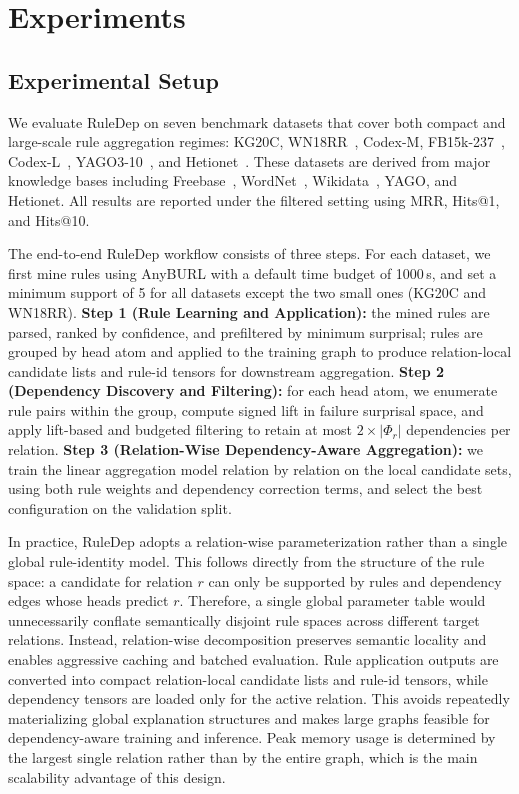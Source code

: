 \section{Experiments}
\label{sec:exp}

\subsection{Experimental Setup}

We evaluate RuleDep on seven benchmark datasets that cover both compact and large-scale rule aggregation regimes: KG20C, WN18RR~\cite{dettmers2018convolutional}, Codex-M, FB15k-237~\cite{toutanova2015observed}, Codex-L~\cite{safavi2020codex}, YAGO3-10~\cite{mahdisoltani2014yago3}, and Hetionet~\cite{himmelstein2017hetionet}. These datasets are derived from major knowledge bases including Freebase~\cite{bollacker2008freebase}, WordNet~\cite{miller1995wordnet}, Wikidata~\cite{vrandecic2014wikidata}, YAGO, and Hetionet. All results are reported under the filtered setting using MRR, Hits@1, and Hits@10.

The end-to-end RuleDep workflow consists of three steps. For each dataset, we first mine rules using AnyBURL with a default time budget of 1000\,s, and set a minimum support of 5 for all datasets except the two small ones (KG20C and WN18RR).
\textbf{Step 1 (Rule Learning and Application):} the mined rules are parsed, ranked by confidence, and prefiltered by minimum surprisal; rules are grouped by head atom and applied to the training graph to produce relation-local candidate lists and rule-id tensors for downstream aggregation.
\textbf{Step 2 (Dependency Discovery and Filtering):} for each head atom, we enumerate rule pairs within the group, compute signed lift in failure surprisal space, and apply lift-based and budgeted filtering to retain at most $2\times|\Phi_r|$ dependencies per relation.
\textbf{Step 3 (Relation-Wise Dependency-Aware Aggregation):} we train the linear aggregation model relation by relation on the local candidate sets, using both rule weights and dependency correction terms, and select the best configuration on the validation split.

In practice, RuleDep adopts a relation-wise parameterization rather than a single global rule-identity model. This follows directly from the structure of the rule space: a candidate for relation $r$ can only be supported by rules and dependency edges whose heads predict $r$. Therefore, a single global parameter table would unnecessarily conflate semantically disjoint rule spaces across different target relations. Instead, relation-wise decomposition preserves semantic locality and enables aggressive caching and batched evaluation. Rule application outputs are converted into compact relation-local candidate lists and rule-id tensors, while dependency tensors are loaded only for the active relation. This avoids repeatedly materializing global explanation structures and makes large graphs feasible for dependency-aware training and inference. Peak memory usage is determined by the largest single relation rather than by the entire graph, which is the main scalability advantage of this design.



